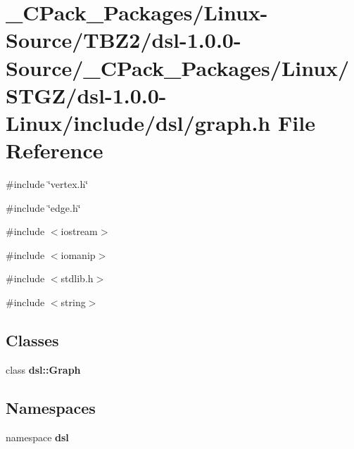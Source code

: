 \section{\_\-CPack\_\-Packages/Linux-\/Source/TBZ2/dsl-\/1.0.0-\/Source/\_\-CPack\_\-Packages/Linux/STGZ/dsl-\/1.0.0-\/Linux/include/dsl/graph.h File Reference}
\label{__CPack__Packages_2Linux-Source_2TBZ2_2dsl-1_80_80-Source_2__CPack__Packages_2Linux_2STGZ_2dsl-1848111b8c4fc9a783e66032efa87a44d}
{\ttfamily \#include \char`\"{}vertex.h\char`\"{}}\par
{\ttfamily \#include \char`\"{}edge.h\char`\"{}}\par
{\ttfamily \#include $<$iostream$>$}\par
{\ttfamily \#include $<$iomanip$>$}\par
{\ttfamily \#include $<$stdlib.h$>$}\par
{\ttfamily \#include $<$string$>$}\par
\subsection*{Classes}
\begin{DoxyCompactItemize}
\item 
class {\bf dsl::Graph}
\end{DoxyCompactItemize}
\subsection*{Namespaces}
\begin{DoxyCompactItemize}
\item 
namespace {\bf dsl}
\end{DoxyCompactItemize}
